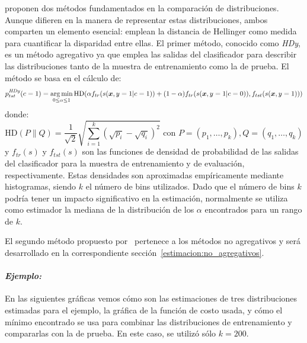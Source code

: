 \citet{gonzalez2013class} proponen dos métodos fundamentados en la comparación
de distribuciones. Aunque difieren en la manera de representar estas
distribuciones, ambos comparten un elemento esencial: emplean la distancia de
Hellinger como medida para cuantificar la disparidad entre ellas. El primer
método, conocido como {\it HDy}, es un método agregativo ya que emplea las
salidas del clasificador para describir las distribuciones tanto de la muestra
de entrenamiento como la de prueba. El método se basa en el cálculo de:
\begin{equation}\label{ecuacion:hdy}
    p^{\it HDy \/}_{tst}(c=1) = \operatorname*{arg\,min}_{0 \leq \alpha \leq 1}{\text{HD}}(\alpha f_{tr}{(s(\boldsymbol{x},y=1|c=1))}+(1-\alpha) f_{tr}{(s(\boldsymbol{x},y=1|c=0))}, f_{tst}{(s(\boldsymbol{x},y=1))})
\end{equation}
donde:
\begin{equation}\label{ecuacion:hd}
    {\text{HD}}(P \parallel Q)= \frac{1}{\sqrt{2}}{\sqrt {\sum _{i=1}^{k}{({\sqrt {p_{i}}}-{\sqrt {q_{i}}})}^{2}}} \text{ con } P=(p_1,\dots,p_k), Q=(q_1,\dots,q_k)
\end{equation}
y \(f_{tr}(s)\) y \(f_{tst}(s)\) son las funciones de densidad de probabilidad
de las salidas del clasificador para la muestra de entrenamiento y de
evaluación, respectivamente. Estas densidades son aproximadas empíricamente
mediante histogramas, siendo \(k\) el número de bins utilizados. Dado que el
número de bins \(k\) podría tener un impacto significativo en la estimación,
normalmente se utiliza como estimador la mediana de la distribución de los
\(\alpha\) encontrados para un rango de \(k\).

El segundo método propuesto por~\citet{gonzalez2013class} pertenece a los
métodos no agregativos y será desarrollado en la correspondiente
sección~\ref{estimacion:no_agregativos}.

\paragraph{\it Ejemplo:\/} En las siguientes gráficas vemos cómo son las
estimaciones de tres distribuciones estimadas para el ejemplo, la gráfica de la
función de costo usada, y cómo el mínimo encontrado se usa para combinar las
distribuciones de entrenamiento y compararlas con la de prueba. En este caso, se
utilizó sólo \(k=200\).

